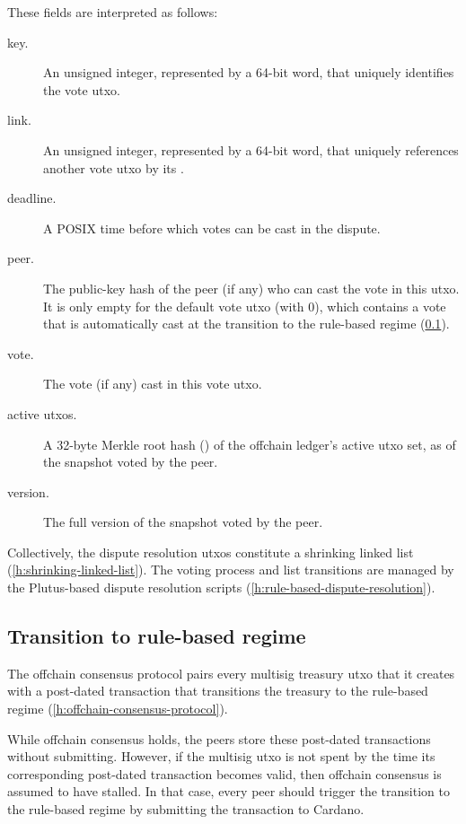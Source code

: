 \documentclass[../hydrozoa.tex]{subfiles}
\begin{document}
These fields are interpreted as follows:
\begin{description}
  \item[key.] An unsigned integer, represented by a 64-bit word, that uniquely identifies the vote utxo.
  \item[link.] An unsigned integer, represented by a 64-bit word, that uniquely references another vote utxo by its .
  \item[deadline.] A POSIX time before which votes can be cast in the dispute.
  \item[peer.] The public-key hash of the peer (if any) who can cast the vote in this utxo. It is only empty for the default vote utxo (with  0), which contains a vote that is automatically cast at the transition to the rule-based regime (\cref{h:rule-based-transition}).
  \item[vote.] The vote (if any) cast in this vote utxo.
  \item[active utxos.] A 32-byte Merkle root hash () of the offchain ledger's active utxo set, as of the snapshot voted by the peer.
  \item[version.] The full version of the snapshot voted by the peer.
\end{description}

Collectively, the dispute resolution utxos constitute a shrinking linked list (\cref{h:shrinking-linked-list}).
The voting process and list transitions are managed by the Plutus-based dispute resolution scripts (\cref{h:rule-based-dispute-resolution}).

\subsection{Transition to rule-based regime}%
\label{h:rule-based-transition}

The offchain consensus protocol pairs every multisig treasury utxo that it creates with a post-dated transaction that transitions the treasury to the rule-based regime (\cref{h:offchain-consensus-protocol}).

While offchain consensus holds, the peers store these post-dated transactions without submitting.
However, if the multisig utxo is not spent by the time its corresponding post-dated transaction becomes valid, then offchain consensus is assumed to have stalled.
In that case, every peer should trigger the transition to the rule-based regime by submitting the transaction to Cardano.
\end{document}

